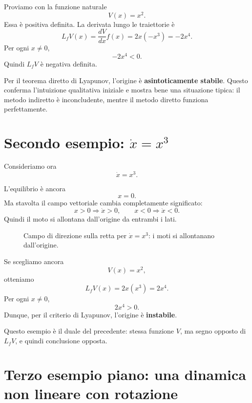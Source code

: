 Proviamo con la funzione naturale
\[
V(x)=x^2.
\]
Essa è positiva definita. La derivata lungo le traiettorie è
\[
L_fV(x)=\frac{dV}{dx}f(x)=2x(-x^3)=-2x^4.
\]
Per ogni \(x\neq 0\),
\[
-2x^4<0.
\]
Quindi \(L_fV\) è negativa definita.

Per il teorema diretto di Lyapunov, l'origine è \textbf{asintoticamente stabile}.  
Questo conferma l'intuizione qualitativa iniziale e mostra bene una situazione tipica: il metodo indiretto è inconcludente, mentre il metodo diretto funziona perfettamente.

\section{Secondo esempio: \(\dot x=x^3\)}

Consideriamo ora
\[
\dot x=x^3.
\]

L'equilibrio è ancora
\[
x=0.
\]
Ma stavolta il campo vettoriale cambia completamente significato:
\[
x>0 \Longrightarrow \dot x>0,
\qquad
x<0 \Longrightarrow \dot x<0.
\]
Quindi il moto si allontana dall'origine da entrambi i lati.

\begin{figure}[h!]
\centering
{}
\caption{Campo di direzione sulla retta per \(\dot x=x^3\): i moti si allontanano dall'origine.}
\end{figure}

Se scegliamo ancora
\[
V(x)=x^2,
\]
otteniamo
\[
L_fV(x)=2x(x^3)=2x^4.
\]
Per ogni \(x\neq 0\),
\[
2x^4>0.
\]
Dunque, per il criterio di Lyapunov, l'origine è \textbf{instabile}.

Questo esempio è il duale del precedente: stessa funzione \(V\), ma segno opposto di \(L_fV\), e quindi conclusione opposta.

\section{Terzo esempio piano: una dinamica non lineare con rotazione}

